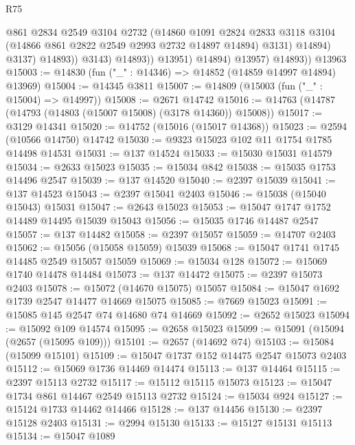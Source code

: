 \begin{lexlean}{R75}
\begin{coremodule}
                            @861
                            @2834
                            @2549
                            @3104
                            @2732
                            (@14860
                              @1091
                              @2824
                              @2833
                              @3118
                              @3104
                              (@14866 @861 @2822 @2549 @2993 @2732 @14897 @14894)
                              @3131)
                            @14894)
                          @3137)
                        @14893))
                    @3143)
                  @14893))
              @13951)
            @14894)
          @13957)
        @14893))
    @13963
@15003 := @14830 (fun ("_" : @14346) => @14852 (@14859 @14997 @14894) @13969)
@15004 := @14345 @3811
@15007 := @14809 (@15003 (fun ("_" : @15004) => @14997))
@15008 := @2671 @14742
@15016 := @14763 (@14787 (@14793 (@14803 (@15007 @15008) (@3178 @14360)) @15008))
@15017 := @3129 @14341
@15020 := @14752 (@15016 (@15017 @14368))
@15023 := @2594 (@10566 @14750) @14742
@15030 := @9323 @15023 @102 @11 @1754 @1785 @14498 @14531
@15031 := @137 @14524
@15033 := @15030 @15031 @14579
@15034 := @2633 @15023
@15035 := @15034 @842
@15038 := @15035 @1753 @14496 @2547
@15039 := @137 @14520
@15040 := @2397 @15039
@15041 := @137 @14523
@15043 := @2397 @15041 @2403
@15046 := @15038 (@15040 @15043) @15031
@15047 := @2643 @15023
@15053 := @15047 @1747 @1752 @14489 @14495 @15039 @15043
@15056 := @15035 @1746 @14487 @2547
@15057 := @137 @14482
@15058 := @2397 @15057
@15059 := @14707 @2403
@15062 := @15056 (@15058 @15059) @15039
@15068 := @15047 @1741 @1745 @14485 @2549 @15057 @15059
@15069 := @15034 @128
@15072 := @15069 @1740 @14478 @14484
@15073 := @137 @14472
@15075 := @2397 @15073 @2403
@15078 := @15072 (@14670 @15075) @15057
@15084 := @15047 @1692 @1739 @2547 @14477 @14669 @15075
@15085 := @7669 @15023
@15091 := @15085 @145 @2547 @74 @14680 @74 @14669
@15092 := @2652 @15023
@15094 := @15092 @109 @14574
@15095 := @2658 @15023
@15099 := @15091 (@15094 (@2657 (@15095 @109)))
@15101 := @2657 (@14692 @74)
@15103 := @15084 (@15099 @15101)
@15109 := @15047 @1737 @152 @14475 @2547 @15073 @2403
@15112 := @15069 @1736 @14469 @14474
@15113 := @137 @14464
@15115 := @2397 @15113 @2732
@15117 := @15112 @15115 @15073
@15123 := @15047 @1734 @861 @14467 @2549 @15113 @2732
@15124 := @15034 @924
@15127 := @15124 @1733 @14462 @14466
@15128 := @137 @14456
@15130 := @2397 @15128 @2403
@15131 := @2994 @15130
@15133 := @15127 @15131 @15113
@15134 := @15047 @1089

\end{coremodule}
\end{lexlean}
